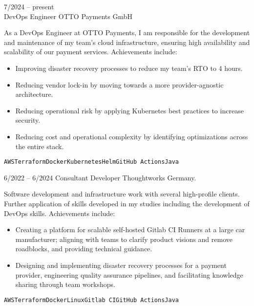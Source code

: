 \documentclass[9pt]{developercv} %
\begin{document}
    \begin{entrylist}
        \entry
        {7/2024 -- present\\}
        {DevOps Engineer}
        {OTTO Payments GmbH}
        {As a DevOps Engineer at OTTO Payments, I am responsible for the development and maintenance of my team's
        cloud infrastructure, ensuring high availability and scalability of our payment services. Achievements include:
            \begin{itemize}
                \item Improving disaster recovery processes to reduce my team's RTO to 4 hours.
                \item Reducing vendor lock-in by moving towards a more provider-agnostic architecture.
                \item Reducing operational risk by applying Kubernetes best practices to increase security.
                \item Reducing cost and operational complexity by identifying optimizations across the entire stack.
            \end{itemize}
            \texttt{AWS}\slashsep\texttt{Terraform}\slashsep\texttt{Docker}\slashsep\texttt{Kubernetes}\slashsep\texttt{Helm}\slashsep\texttt{GitHub Actions}\slashsep\texttt{Java}\\
        }

        \entry
        {6/2022 -- 6/2024}
        {Consultant Developer}
        {Thoughtworks Germany.}
        {Software development and infrastructure work with several high-profile clients.
        Further application of skills developed in my studies including the development of DevOps skills.
        Achievements include:

            \begin{itemize}
                \item Creating a platform for scalable self-hosted Gitlab CI Runners at a large car manufacturer;
                aligning with teams to clarify product visions and remove roadblocks, and providing technical guidance.
                \item Designing and implementing disaster recovery processes for a payment provider, engineering quality
                assurance pipelines, and facilitating knowledge sharing through team workshops.
            \end{itemize}
            \texttt{AWS}\slashsep\texttt{Terraform}\slashsep\texttt{Docker}\slashsep\texttt{Linux}\slashsep\texttt{Gitlab CI}\slashsep\texttt{GitHub Actions}\slashsep\texttt{Java}\\
        }


\end{entrylist}
\end{document}
